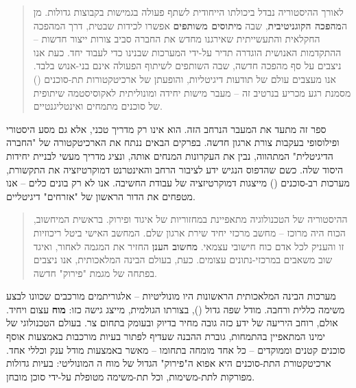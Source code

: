 

\begin{quote}
לאורך ההיסטוריה נבדל \textit{} ביכולתו הייחודית לשתף פעולה בגמישות בקבוצות גדולות. מן ה\textbf{מהפכה הקוגניטיבית}, שבה \textbf{מיתוסים משותפים} אפשרו לכידות שבטית, דרך המהפכה החקלאית והתעשייתית שאירגנו מחדש את החברה סביב צורות ייצור חדשות – ההתקדמות האנושית הוגדרה תדיר על-ידי המערכות שבנינו כדי לעבוד יחד. כעת אנו ניצבים על סף מהפכה חדשה, שבה השותפים לשיתוף הפעולה אינם בני-אנוש בלבד. אנו מעצבים עולם של תודעות דיגיטליות, והופעתן של ארכיטקטורות תת-סוכנים () מסמנת רגע מכריע בנרטיב זה – מעבר מישות \textbf{} יחידה ומונוליתית לאקוסיסטמה שיתופית של סוכנים מתמחים ואינטליגנטיים.
\end{quote}

ספר זה מתעד את המעבר הנרחב הזה. הוא אינו רק מדריך טכני, אלא גם מסע היסטורי ופילוסופי בעקבות צורת ארגון חדשה. בפרקים הבאים ננתח את הארכיטקטורה של "החברה הדיגיטלית" המתהווה, נבין את העקרונות המנחים אותה, ונציג מדריך מעשי לבניית יחידות היסוד שלה. כשם שהדפוס הנגיש ידע לציבור הרחב והאינטרנט דמוקרטיזציה את התקשורת, מערכות רב-סוכנים () מייצגות דמוקרטיזציה של עבודת החשיבה. אנו לא רק בונים כלים – אנו מטפחים את הדור הראשון של "אזרחים" דיגיטליים.


\begin{quote}
ההיסטוריה של הטכנולוגיה מתאפיינת במחזוריות של איגוד ופירוק. בראשית המיחשוב, הכוח היה מרוכז – מחשב מרכזי יחיד שירת ארגון שלם. המחשב האישי ביטל ריכוזיות זו והעניק לכל אדם כוח חישובי עצמאי. \textbf{מחשוב הענן} החזיר את המגמה לאחור, ואיגד שוב משאבים במרכזי-נתונים עצומים. כעת, בעולם הבינה המלאכותית, אנו ניצבים בפתחה של מגמת "פירוק" חדשה.
\end{quote}

מערכות הבינה המלאכותית הראשונות היו מונוליטיות – אלגוריתמים מורכבים שכוונו לבצע משימה כללית ורחבה. מודל שפה גדול (), בצורתו הגולמית, מייצג גישה כזו: \textbf{מוח} עצום ויחיד. אולם, רוחב היריעה של ידע כזה גובה מחיר בדיוק ובעומק בתחום צר. בעולם הטכנולוגי של ימינו המתאפיין בהתמחות, גוברת ההבנה שעדיף לפתור בעיות מורכבות באמצעות אוסף סוכנים קטנים וממוקדים – כל אחד מומחה בתחומו – מאשר באמצעות מודל ענק וכללי אחד. ארכיטקטורת התת-סוכנים היא אפוא ה"פירוק" הגדול של מוח ה המונוליטי: בעיות גדולות מפורקות לתת-משימות, וכל תת-משימה מטופלת על-ידי סוכן מובחן.

